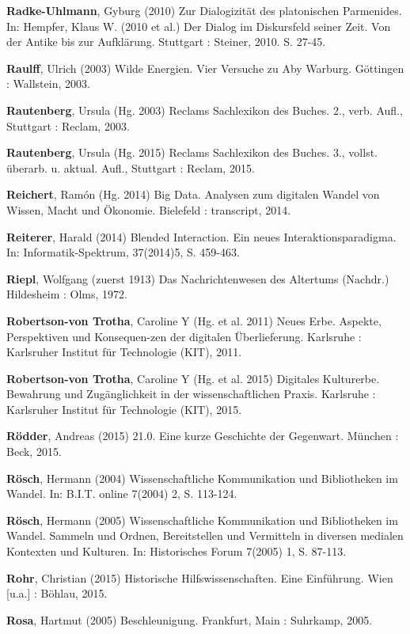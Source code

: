 \documentclass[a4paper,
fontsize=11pt,
oneside,
numbers=noperiodatend,
parskip=half-,
bibliography=totoc,
final
]{scrartcl}
\begin{document}
\textbf{Radke-Uhlmann}, Gyburg (2010) Zur Dialogizität des platonischen
Parmenides. In: Hempfer, Klaus W. (2010 et al.) Der Dialog im
Diskursfeld seiner Zeit. Von der Antike bis zur Aufklärung. Stuttgart :
Steiner, 2010. S. 27-45.

\textbf{Raulff}, Ulrich (2003) Wilde Energien. Vier Versuche zu Aby
Warburg. Göttingen : Wallstein, 2003.

\textbf{Rautenberg}, Ursula (Hg. 2003) Reclams Sachlexikon des Buches.
2., verb. Aufl., Stuttgart : Reclam, 2003.

\textbf{Rautenberg}, Ursula (Hg. 2015) Reclams Sachlexikon des Buches.
3., vollst. überarb. u. aktual. Aufl., Stuttgart : Reclam, 2015.

\textbf{Reichert}, Ramón (Hg. 2014) Big Data. Analysen zum digitalen
Wandel von Wissen, Macht und Ökonomie. Bielefeld : transcript, 2014.

\textbf{Reiterer}, Harald (2014) Blended Interaction. Ein neues
Interaktionsparadigma. In: Informatik-Spektrum, 37(2014)5, S. 459-463.

\textbf{Riepl}, Wolfgang (zuerst 1913) Das Nachrichtenwesen des
Altertums (Nachdr.) Hildesheim : Olms, 1972.

\textbf{Robertson-von Trotha}, Caroline Y (Hg. et al. 2011) Neues Erbe.
Aspekte, Perspektiven und Konsequen-zen der digitalen Überlieferung.
Karlsruhe : Karlsruher Institut für Technologie (KIT), 2011.

\textbf{Robertson-von Trotha}, Caroline Y (Hg. et al. 2015) Digitales
Kulturerbe. Bewahrung und Zugänglichkeit in der wissenschaftlichen
Praxis. Karlsruhe : Karlsruher Institut für Technologie (KIT), 2015.

\textbf{Rödder}, Andreas (2015) 21.0. Eine kurze Geschichte der
Gegenwart. München : Beck, 2015.

\textbf{Rösch}, Hermann (2004) Wissenschaftliche Kommunikation und
Bibliotheken im Wandel. In: B.I.T. online 7(2004) 2, S. 113-124.

\textbf{Rösch}, Hermann (2005) Wissenschaftliche Kommunikation und
Bibliotheken im Wandel. Sammeln und Ordnen, Bereitstellen und Vermitteln
in diversen medialen Kontexten und Kulturen. In: Historisches Forum
7(2005) 1, S. 87-113.

\textbf{Rohr}, Christian (2015) Historische Hilfswissenschaften. Eine
Einführung. Wien {[}u.a.{]} : Böhlau, 2015.

\textbf{Rosa}, Hartmut (2005) Beschleunigung. Frankfurt, Main :
Suhrkamp, 2005.
\end{document}
